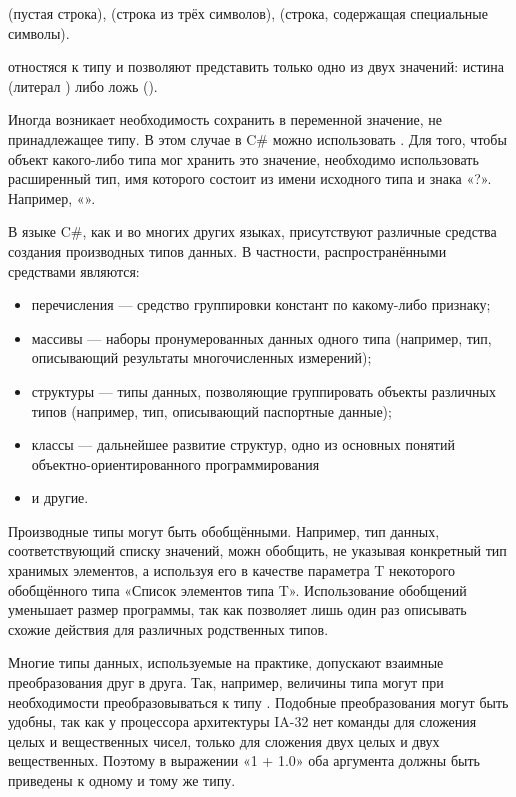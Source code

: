 \begin{example}
   (пустая строка),
   (строка из трёх
  символов),
   (строка,
  содержащая специальные символы).
\end{example}

 отностяся к типу
 и позволяют представить только одно из двух значений:
истина (литерал ) либо ложь ().

Иногда возникает необходимость сохранить в переменной значение, не
принадлежащее типу. В этом случае в C\# можно использовать
. %
Для того, чтобы объект какого-либо типа
мог хранить это значение, необходимо использовать расширенный тип, имя
которого состоит из имени исходного типа и знака «?». Например,
«».

В языке C\#, как и во многих других языках, присутствуют различные
средства создания производных типов данных. В частности, распространёнными
средствами являются:
\begin{itemize}
\item перечисления — средство группировки констант по какому-либо
  признаку;
\item массивы — наборы пронумерованных данных одного типа (например,
  тип, описывающий результаты многочисленных измерений);
\item структуры — типы данных, позволяющие группировать объекты
  различных типов (например, тип, описывающий паспортные данные);
\item классы — дальнейшее развитие структур, одно из основных понятий
  объектно-ориентированного программирования
\item и другие.
\end{itemize}

Производные типы могут быть обобщёнными. Например, тип данных,
соответствующий списку значений, можн обобщить, не указывая конкретный
тип хранимых элементов, а используя его в качестве параметра T
некоторого обобщённого типа «Список элементов типа T». Использование
обобщений уменьшает размер программы, так как позволяет лишь один раз
описывать схожие действия для различных родственных типов.

Многие типы данных, используемые на практике, допускают взаимные
преобразования друг в друга. Так, например, величины типа 
могут при необходимости преобразовываться к типу
. Подобные преобразования могут быть удобны, так как у
процессора архитектуры IA-32 нет команды для сложения целых и
вещественных чисел, только для сложения двух целых и двух
вещественных. Поэтому в выражении «1 + 1.0» оба аргумента должны быть
приведены к одному и тому же типу.

